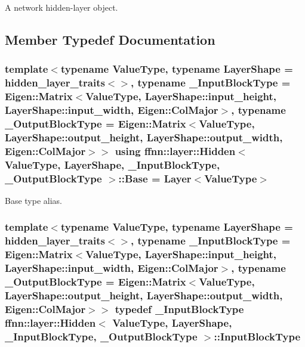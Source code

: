 A network hidden-\/layer object. 

\subsection{Member Typedef Documentation}
\hypertarget{classffnn_1_1layer_1_1_hidden_a2ff8a0b925b2b929b05e7889dda361e4}{
\subsubsection[{Base}]{\setlength{\rightskip}{0pt plus 5cm}template$<$typename Value\-Type, typename Layer\-Shape = hidden\-\_\-layer\-\_\-traits$<$$>$, typename \-\_\-\-Input\-Block\-Type = Eigen\-::\-Matrix$<$\-Value\-Type, Layer\-Shape\-::input\-\_\-height,  Layer\-Shape\-::input\-\_\-width,  Eigen\-::\-Col\-Major$>$, typename \-\_\-\-Output\-Block\-Type = Eigen\-::\-Matrix$<$\-Value\-Type, Layer\-Shape\-::output\-\_\-height, Layer\-Shape\-::output\-\_\-width, Eigen\-::\-Col\-Major$>$$>$ using {\bf ffnn\-::layer\-::\-Hidden}$<$ Value\-Type, Layer\-Shape, \-\_\-\-Input\-Block\-Type, \-\_\-\-Output\-Block\-Type $>$\-::{\bf Base} =  {\bf Layer}$<$Value\-Type$>$}}\label{classffnn_1_1layer_1_1_hidden_a2ff8a0b925b2b929b05e7889dda361e4}


Base type alias. 

\hypertarget{classffnn_1_1layer_1_1_hidden_ae401b1af7763caf09a0dffcaf4f2d5e9}{
\subsubsection[{Input\-Block\-Type}]{\setlength{\rightskip}{0pt plus 5cm}template$<$typename Value\-Type, typename Layer\-Shape = hidden\-\_\-layer\-\_\-traits$<$$>$, typename \-\_\-\-Input\-Block\-Type = Eigen\-::\-Matrix$<$\-Value\-Type, Layer\-Shape\-::input\-\_\-height,  Layer\-Shape\-::input\-\_\-width,  Eigen\-::\-Col\-Major$>$, typename \-\_\-\-Output\-Block\-Type = Eigen\-::\-Matrix$<$\-Value\-Type, Layer\-Shape\-::output\-\_\-height, Layer\-Shape\-::output\-\_\-width, Eigen\-::\-Col\-Major$>$$>$ typedef \-\_\-\-Input\-Block\-Type {\bf ffnn\-::layer\-::\-Hidden}$<$ Value\-Type, Layer\-Shape, \-\_\-\-Input\-Block\-Type, \-\_\-\-Output\-Block\-Type $>$\-::{\bf Input\-Block\-Type}}}\label{classffnn_1_1layer_1_1_hidden_ae401b1af7763caf09a0dffcaf4f2d5e9}


